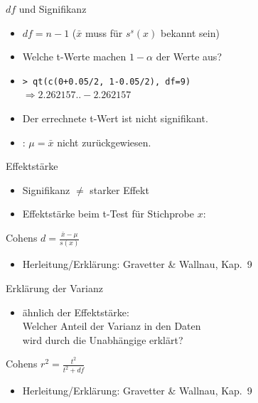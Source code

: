 
\begin{frame}
  {$df$ und Signifikanz}
  \begin{itemize}[<+->]
    \item \alert{$df=n-1$} ($\bar{x}$ muss für $s^s(x)$ bekannt sein)
    \item Welche t-Werte machen $1-\alpha$ der Werte aus?
    \item \texttt{> qt(c(0+0.05/2, 1-0.05/2), df=9)\\
      $\Rightarrow 2.262157 .. -2.262157$}
    \item Der errechnete t-Wert ist nicht signifikant.
    \item \Null: $\mu=\bar{x}$ nicht zurückgewiesen.
  \end{itemize}
\end{frame}

\begin{frame}
  {Effektstärke}
  \begin{itemize}[<+->]
    \item Signifikanz $\neq$ starker Effekt
    \item Effektstärke beim t-Test für Stichprobe $x$:
  \end{itemize}
  \pause
  \begin{center}
    \alert{Cohens $d=\frac{\bar{x}-\mu}{s(x)}$}
  \end{center}
  \pause
  \begin{itemize}
    \item Herleitung\slash Erklärung: Gravetter \& Wallnau, Kap.\ 9
  \end{itemize}
\end{frame}

\begin{frame}
  {Erklärung der Varianz}
  \begin{itemize}
    \item ähnlich der Effektstärke: \\
      \alert{Welcher Anteil der Varianz in den Daten\\
      wird durch die Unabhängige erklärt?}
  \end{itemize}
  \pause
  \begin{center}
    \alert{Cohens $r^2=\frac{t^2}{t^2+df}$}
  \end{center}
  \pause
  \begin{itemize}
    \item Herleitung\slash Erklärung: Gravetter \& Wallnau, Kap.\ 9
  \end{itemize}
\end{frame}

